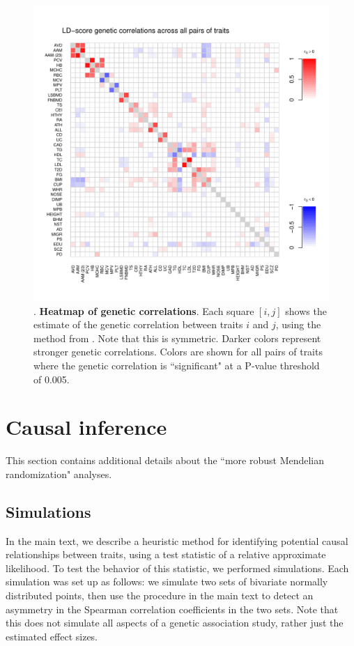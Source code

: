\documentclass[11pt,titlepage]{article}
\begin{document}
\begin{figure}
\begin{center}
\includegraphics[scale = 0.6]{figs/heatmap_0_005_rg.pdf}
\caption{. \textbf{Heatmap of genetic correlations}. Each square $[i,j]$ shows the estimate of the genetic correlation between traits $i$ and $j$, using the method from  \citet{bulik2015atlas}. Note that this is symmetric. Darker colors represent stronger genetic correlations. Colors are shown for all pairs of traits where the genetic correlation is ``significant" at a P-value threshold of 0.005.}\label{f_rg}
\end{center}
\end{figure}

\section{Causal inference}
This section contains additional details about the ``more robust Mendelian randomization" analyses.
\subsection{Simulations}
In the main text, we describe a heuristic method for identifying potential causal relationships between traits, using a test statistic of a relative approximate likelihood. To test the behavior of this statistic, we performed simulations. Each simulation was set up as follows: we simulate two sets of bivariate normally distributed points, then use the procedure in the main text to detect an asymmetry in the Spearman correlation coefficients in the two sets. Note that this does not simulate all aspects of a genetic association study, rather just the estimated effect sizes. 
\end{document}
